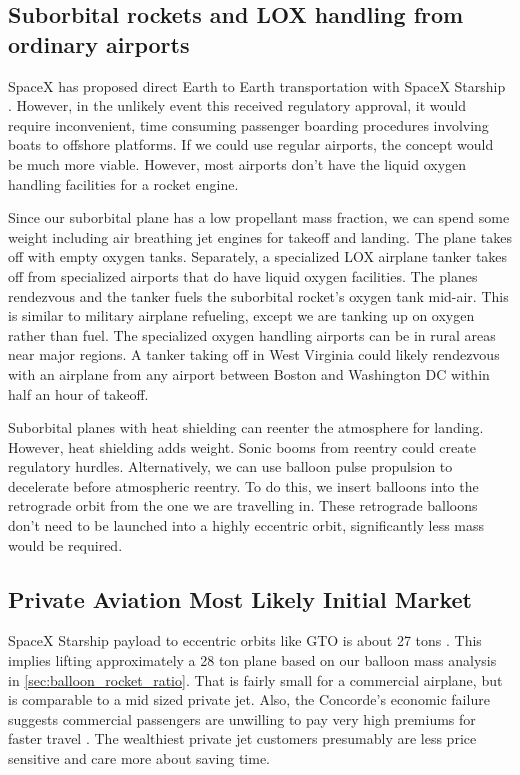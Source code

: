 \documentclass{article}
\begin{document}
\subsection{Suborbital rockets and LOX handling from ordinary airports}\label{sec:suborbital_airports}
SpaceX has proposed direct Earth to Earth transportation with SpaceX Starship \cite{spacex_earth_earth}.   However, in the unlikely event this received regulatory approval, it would require inconvenient, time consuming passenger boarding procedures involving boats to offshore platforms.   If we could use regular airports, the concept would be much more viable.    However, most airports don't have the liquid oxygen handling facilities for a rocket engine.

Since our suborbital plane has a low propellant mass fraction, we can spend some weight including air breathing jet engines for takeoff and landing.   The plane takes off with empty oxygen tanks.   Separately, a specialized LOX airplane tanker takes off from specialized airports that do have liquid oxygen facilities.    The planes rendezvous and the tanker fuels the suborbital rocket's oxygen tank mid-air.   This is similar to military airplane refueling, except we are tanking up on oxygen rather than fuel.   The specialized oxygen handling airports can be in rural areas near major regions.   A tanker taking off in West Virginia could likely rendezvous with an airplane from any airport between Boston and Washington DC within half an hour of takeoff.   

Suborbital planes with heat shielding can reenter the atmosphere for landing.   However, heat shielding adds weight.   Sonic booms from reentry could create regulatory hurdles.   Alternatively, we can use balloon pulse propulsion to decelerate before atmospheric reentry.   To do this, we insert balloons into the retrograde orbit from the one we are travelling in.   These retrograde balloons don't need to be launched into a highly eccentric orbit, significantly less mass would be required.

\subsection{Private Aviation Most Likely Initial Market}\label{sec:private_aviation}
SpaceX Starship payload to eccentric orbits like GTO is about 27 tons \cite{spacex_user_guide}.   This implies lifting approximately a 28 ton plane based on our balloon mass analysis in \autoref{sec:balloon_rocket_ratio}.   That is fairly small for a commercial airplane, but is comparable to a mid sized private jet.   Also, the Concorde's economic failure suggests commercial passengers are unwilling to pay very high premiums for faster travel \cite{concorde_expensive}.  The wealthiest private jet customers presumably are less price sensitive and care more about saving time.    
\end{document}
